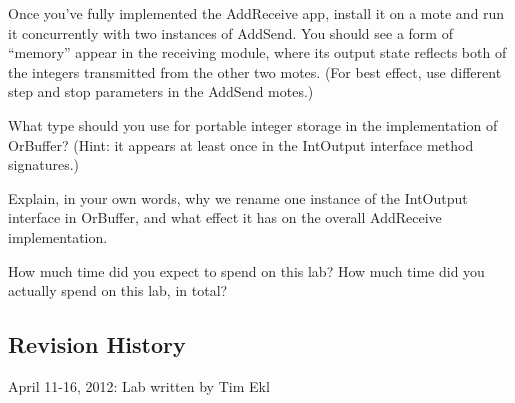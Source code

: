 \documentclass{article}
\begin{document}
Once you've fully implemented the AddReceive app, install it on a mote and run it concurrently with two instances of AddSend. You should see a form of ``memory'' appear in the receiving module, where its output state reflects both of the integers transmitted from the other two motes. (For best effect, use different step and stop parameters in the AddSend motes.)

 What type should you use for portable integer storage in the implementation of OrBuffer? (Hint: it appears at least once in the IntOutput interface method signatures.)

 Explain, in your own words, why we rename one instance of the IntOutput interface in OrBuffer, and what effect it has on the overall AddReceive implementation.

 How much time did you expect to spend on this lab? How much time did you actually spend on this lab, in total?



\subsection*{Revision History}
\begin{itemize*}
\item April 11-16, 2012: Lab written by Tim Ekl
\end{itemize*}
\end{document}
